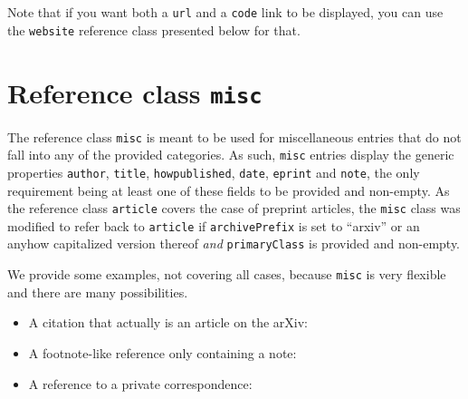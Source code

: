 \documentclass[a4paper,twocolumn,11pt]{quantumarticle}
\begin{document}
Note that if you want both a \texttt{url} and a \texttt{code} link to be displayed, you can use the \texttt{website} reference class presented below for that.


\section{Reference class \texttt{misc}}\label{sec:misc}
The reference class \texttt{misc} is meant to be used for miscellaneous entries that do not fall into any of the provided categories.
As such, \texttt{misc} entries display the generic properties \texttt{author}, \texttt{title}, \texttt{howpublished}, \texttt{date}, \texttt{eprint} and \texttt{note}, the only requirement being at least one of these fields to be provided and non-empty.
As the reference class \texttt{article} covers the case of preprint articles, the \texttt{misc} class was modified to refer back to \texttt{article} if \texttt{archivePrefix} is set to ``arxiv'' or an anyhow capitalized version thereof \emph{and} \texttt{primaryClass} is provided and non-empty.

We provide some examples, not covering all cases, because \texttt{misc} is very flexible and there are many possibilities.
\begin{itemize}
    \item A citation that actually is an article on the arXiv: 
    \item A footnote-like reference only containing a note: 
    \item A reference to a private correspondence: 
\end{itemize}




\end{document}
